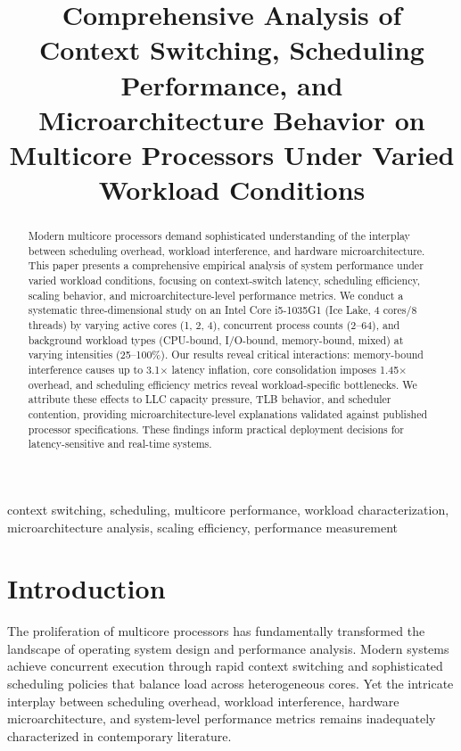\documentclass[conference]{IEEEtran}
\title{Comprehensive Analysis of Context Switching, Scheduling Performance,
       and Microarchitecture Behavior on Multicore Processors Under
       Varied Workload Conditions}
\author{
  \IEEEauthorblockN{Shikhar Mutta}
  \IEEEauthorblockA{
    Department of Computer Science and Engineering\\
    Indian Institute of Technology\\
    \textit{shikhar@example.edu}}
}
\begin{document}
\maketitle

\begin{abstract}
Modern multicore processors demand sophisticated understanding of the interplay
between scheduling overhead, workload interference, and hardware microarchitecture.
This paper presents a comprehensive empirical analysis of system performance
under varied workload conditions, focusing on context-switch latency, scheduling
efficiency, scaling behavior, and microarchitecture-level performance metrics.
We conduct a systematic three-dimensional study on an Intel Core i5-1035G1
(Ice Lake, 4 cores/8 threads) by varying active cores (1, 2, 4), concurrent
process counts (2--64), and background workload types (CPU-bound, I/O-bound,
memory-bound, mixed) at varying intensities (25--100\%).
Our results reveal critical interactions: memory-bound interference causes up to
3.1$\times$ latency inflation, core consolidation imposes 1.45$\times$ overhead,
and scheduling efficiency metrics reveal workload-specific bottlenecks.
We attribute these effects to LLC capacity pressure, TLB behavior, and scheduler
contention, providing microarchitecture-level explanations validated against
published processor specifications.
These findings inform practical deployment decisions for latency-sensitive and
real-time systems.
\end{abstract}

\begin{IEEEkeywords}
context switching, scheduling, multicore performance, workload characterization,
microarchitecture analysis, scaling efficiency, performance measurement
\end{IEEEkeywords}

\section{Introduction}
\label{sec:intro}

The proliferation of multicore processors has fundamentally transformed the
landscape of operating system design and performance analysis. Modern systems
achieve concurrent execution through rapid context switching and sophisticated
scheduling policies that balance load across heterogeneous cores. Yet the
intricate interplay between scheduling overhead, workload interference,
hardware microarchitecture, and system-level performance metrics remains
inadequately characterized in contemporary literature.
\end{document}

